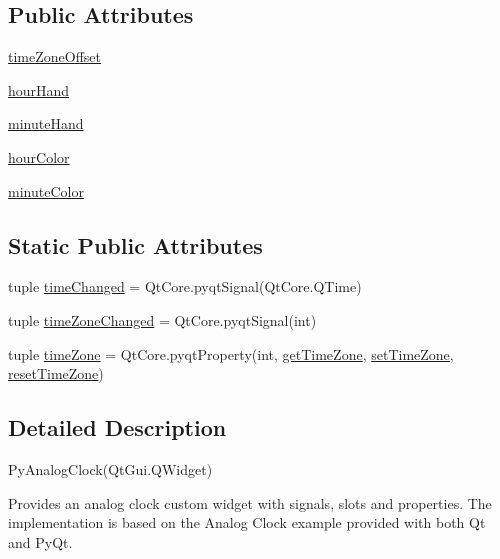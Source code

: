 \subsection*{Public Attributes}
\begin{DoxyCompactItemize}
\item 
\hyperlink{classanalogclock_1_1PyAnalogClock_a4ce878d192bcf919512801b2aa9c3611}{time\+Zone\+Offset}
\item 
\hyperlink{classanalogclock_1_1PyAnalogClock_a3c37b2d7ffbff8673ff00e95d989862e}{hour\+Hand}
\item 
\hyperlink{classanalogclock_1_1PyAnalogClock_a2bb906d2616ba2bad35e994e82cd4e9b}{minute\+Hand}
\item 
\hyperlink{classanalogclock_1_1PyAnalogClock_ae297f0506f5c650a33843f4bde851edf}{hour\+Color}
\item 
\hyperlink{classanalogclock_1_1PyAnalogClock_ac7305430236b3149139243b10f5c26cc}{minute\+Color}
\end{DoxyCompactItemize}
\subsection*{Static Public Attributes}
\begin{DoxyCompactItemize}
\item 
tuple \hyperlink{classanalogclock_1_1PyAnalogClock_a94cfb08695b25d53e892cc1a56c7336a}{time\+Changed} = Qt\+Core.\+pyqt\+Signal(Qt\+Core.\+Q\+Time)
\item 
tuple \hyperlink{classanalogclock_1_1PyAnalogClock_a0551a5e06a195368d86c22623cf0f68b}{time\+Zone\+Changed} = Qt\+Core.\+pyqt\+Signal(int)
\item 
tuple \hyperlink{classanalogclock_1_1PyAnalogClock_a3227cb72bfb8fe7ffe3ab44b375dc432}{time\+Zone} = Qt\+Core.\+pyqt\+Property(int, \hyperlink{classanalogclock_1_1PyAnalogClock_a7e426d6c7d2785d41791f7411a24ae12}{get\+Time\+Zone}, \hyperlink{classanalogclock_1_1PyAnalogClock_a37b3450fc051bf5a5b587b2e05529578}{set\+Time\+Zone}, \hyperlink{classanalogclock_1_1PyAnalogClock_afcbe05f69db91985c44becce1aaf87a5}{reset\+Time\+Zone})
\end{DoxyCompactItemize}


\subsection{Detailed Description}
\begin{DoxyVerb}PyAnalogClock(QtGui.QWidget)

Provides an analog clock custom widget with signals, slots and properties.
The implementation is based on the Analog Clock example provided with both
Qt and PyQt.
\end{DoxyVerb}
 

